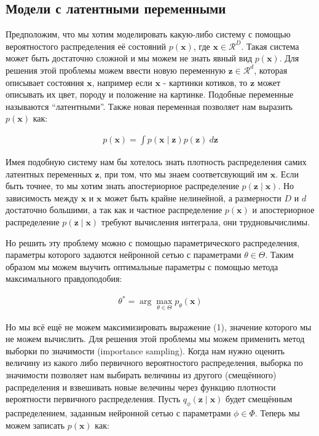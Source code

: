 \documentclass{article}
\begin{document}
\subsection{Модели с латентными переменными}

Предположим, что мы хотим моделировать какую-либо систему с помощью вероятностого распределения её состояний $p(\mathbf{x})$, где
$\mathbf{x} \in \mathcal{R}^D$. Такая система может быть достаточно сложной и мы можем не знать явный вид $p(\mathbf{x})$. Для решения этой проблемы
можем ввести новую переменную $\mathbf{z} \in \mathcal{R}^d$, которая описывает состояния $\mathbf{x}$, например если $\mathbf{x}$ - картинки котиков, то
$\mathbf{z}$ может описывать их цвет, породу и положение на картинке. Подобные переменные называются ``латентными''.
Также новая переменная позволяет нам выразить $p(\mathbf{x})$ как:

\begin{align*}
    p(\mathbf{x}) = \int p(\mathbf{x} \mid \mathbf{z}) p(\mathbf{z}) ~d\mathbf{z}
    \tag{1}
\end{align*}

Имея подобную систему нам бы хотелось знать плотность распределения самих латентных переменных $\mathbf{z}$, при том, что мы знаем соответсвующий
им $\mathbf{x}$. Если быть точнее, то мы хотим знать апостериорное распределение $p(\mathbf{z} \mid \mathbf{x})$. Но зависимость между $\mathbf{x}$ и
$\mathbf{x}$ может быть крайне нелинейной, а размерности $D$ и $d$ достаточно большими, а так как и частное распределение $p(\mathbf{x})$ и апостериорное
распределение $p(\mathbf{z} \mid \mathbf{x})$ требуют вычисления интеграла, они трудновычислимы.

\begin{comment}
    про трудность решения методом монте-карло
\end{comment}

Но решить эту проблему можно с помощью параметрического распределения, параметры которого задаются нейронной сетью с параметрами $\theta \in \Theta$.
Таким образом мы можем выучить оптимальные параметры с помощью метода максимального правдоподобия:

\begin{align*}
   \theta^* = \arg \max_{\theta \in \Theta} p_\theta(\mathbf{x}) 
   \tag{2}
\end{align*}

Но мы всё ещё не можем максимизировать выражение (1), значение которого мы не можем вычислить. Для решения этой проблемы мы можем применить метод
выборки по значимости (importance sampling). Когда нам нужно оценить величину из какого либо первичного вероятностого распределения, выборка по
значимости позволяет нам выбирать величины из другого (смещённого) распределения и взвешивать новые велечины через функцию плотности вероятности 
первичного распределения. Пусть $q_\phi(\mathbf{z} \mid \mathbf{x})$ будет смещённым распределением, заданным нейронной сетью с параметрами $\phi \in \Phi$.
Теперь мы можем записать $p(\mathbf{x})$ как:
\end{document}
